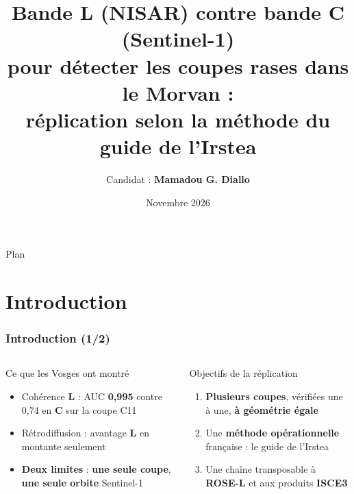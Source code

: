 \documentclass[aspectratio=169]{beamer}
\title{\Large
	Bande L (NISAR) contre bande C (Sentinel-1)\\
	pour détecter les coupes rases dans le Morvan :\\[4pt]
	{\normalsize réplication selon la méthode du guide de l'Irstea}
}
\author{%
	Candidat : \textbf{Mamadou G. Diallo}
}
\date{Novembre 2026}
\newcommand{\Lb}[1]{\textcolor{Lband}{\textbf{#1}}}
\newcommand{\Cb}[1]{\textcolor{Cband}{\textbf{#1}}}
\begin{document}
\begin{frame}
	\titlepage
\end{frame}

\begin{frame}{Plan}
	\tableofcontents
\end{frame}

\section{Introduction}

\begin{frame}{\phantom{x}}
	\frametitle{Introduction (1/2)}
	\vspace{-6pt}\scriptsize
	\begin{columns}[T]
		\begin{block}{Ce que les Vosges ont montré}
			\scriptsize
			\begin{itemize}
				\setlength{\itemsep}{0pt}
				\item Cohérence \Lb{L} : AUC \textbf{0,995} contre 0,74 en \Cb{C} sur la coupe C11
				\item Rétrodiffusion : avantage \Lb{L} en montante seulement
				\item \textcolor{myorange}{\textbf{Deux limites}} : \textbf{une seule coupe}, \textbf{une seule orbite}
				Sentinel-1
			\end{itemize}
		\end{block}
		\begin{block}{Objectifs de la réplication}
			\scriptsize
			\begin{enumerate}
				\setlength{\itemsep}{0pt}
				\item \textbf{Plusieurs coupes}, vérifiées une à une, \textbf{à géométrie égale}
				\item Une \textbf{méthode opérationnelle} française : le guide de l'Irstea \parencite{ose2015guide}
				\item Une chaîne transposable à \textbf{ROSE-L} \parencite{esa2020rosel} et aux produits \textbf{ISCE3}
				\parencite{isce3}
			\end{enumerate}
		\end{block}


\end{columns}
\end{frame}
\end{document}
